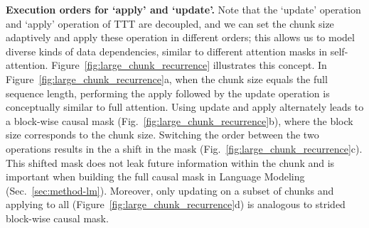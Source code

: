 \noindent\textbf{Execution orders for `apply' and `update'.
}
Note that the `update' operation and `apply' operation of TTT are decoupled,  
and we can set the chunk size adaptively and apply these operation in different 
orders; this allows us to model diverse kinds of data dependencies, similar to different 
attention masks in self-attention. 
Figure~\ref{fig:large_chunk_recurrence} illustrates this concept.
In Figure~\ref{fig:large_chunk_recurrence}a, when the chunk size equals the full sequence length, performing the apply followed by the update operation is conceptually similar to full attention. 
Using update and apply alternately leads to 
a block-wise causal mask (Fig.~\ref{fig:large_chunk_recurrence}b), where the block size corresponds to the chunk size.
Switching the order between the two operations results in the a shift in the mask (Fig.~\ref{fig:large_chunk_recurrence}c). 
This shifted mask 
does not leak future information within the chunk and is important when building the full causal mask 
in Language Modeling (Sec.~\ref{sec:method-lm}).
Moreover, only updating on a subset of chunks 
and applying to all
(Figure~\ref{fig:large_chunk_recurrence}d) is analogous to strided 
block-wise causal mask.


